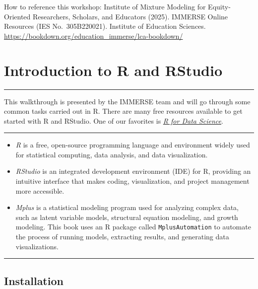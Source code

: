 \documentclass[
]{book}
\begin{document}
How to reference this workshop: Institute of Mixture Modeling for Equity-Oriented Researchers, Scholars, and Educators (2025).
IMMERSE Online Resources (IES No.~305B220021).
Institute of Education Sciences.
\url{https://bookdown.org/education_immerse/lca-bookdown/}

\chapter{Introduction to R and RStudio}\label{introduction-to-r-and-rstudio}

\begin{center}\rule{0.5\linewidth}{0.5pt}\end{center}

This walkthrough is presented by the IMMERSE team and will go through some common tasks carried out in R.
There are many free resources available to get started with R and RStudio.
One of our favorites is \href{https://r4ds.had.co.nz/}{\emph{R for Data Science}}.

\begin{center}\rule{0.5\linewidth}{0.5pt}\end{center}

\begin{itemize}
\item
  \emph{R}\citep{rcore2017} is a free, open-source programming language and environment widely used for statistical computing, data analysis, and data visualization.
\item
  \emph{RStudio}\citep{rstudio2020} is an integrated development environment (IDE) for R, providing an intuitive interface that makes coding, visualization, and project management more accessible.
\item
  \emph{Mplus}\citep{muthen2017} is a statistical modeling program used for analyzing complex data, such as latent variable models, structural equation modeling, and growth modeling.
  This book uses an R package called \texttt{MplusAutomation} to automate the process of running models, extracting results, and generating data visualizations.
\end{itemize}

\begin{center}\rule{0.5\linewidth}{0.5pt}\end{center}

\section{Installation}\label{installation}
\end{document}
